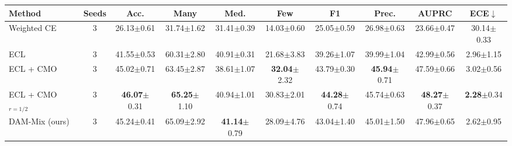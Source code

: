 \begin{tabular}{l c cccccccc}
\toprule
Method & Seeds & Acc. & Many & Med. & Few & F1 & Prec. & AUPRC & ECE$\downarrow$ \\
\midrule
Weighted CE & 3 & 26.13{\scriptsize$\pm$0.61} & 31.74{\scriptsize$\pm$1.62} & 31.41{\scriptsize$\pm$0.39} & 14.03{\scriptsize$\pm$0.60} & 25.05{\scriptsize$\pm$0.59} & 26.98{\scriptsize$\pm$0.63} & 23.66{\scriptsize$\pm$0.47} & 30.14{\scriptsize$\pm$0.33} \\
ECL & 3 & 41.55{\scriptsize$\pm$0.53} & 60.31{\scriptsize$\pm$2.80} & 40.91{\scriptsize$\pm$0.31} & 21.68{\scriptsize$\pm$3.83} & 39.26{\scriptsize$\pm$1.07} & 39.99{\scriptsize$\pm$1.04} & 42.99{\scriptsize$\pm$0.56} & 2.96{\scriptsize$\pm$1.15} \\
ECL + CMO & 3 & 45.02{\scriptsize$\pm$0.71} & 63.45{\scriptsize$\pm$2.87} & 38.61{\scriptsize$\pm$1.07} & \textbf{32.04}{\scriptsize$\pm$2.32} & 43.79{\scriptsize$\pm$0.30} & \textbf{45.94}{\scriptsize$\pm$0.71} & 47.59{\scriptsize$\pm$0.66} & 3.02{\scriptsize$\pm$0.56} \\
ECL + CMO$_{r=1/2}$ & 3 & \textbf{46.07}{\scriptsize$\pm$0.31} & \textbf{65.25}{\scriptsize$\pm$1.10} & 40.94{\scriptsize$\pm$1.01} & 30.83{\scriptsize$\pm$2.01} & \textbf{44.28}{\scriptsize$\pm$0.74} & 45.74{\scriptsize$\pm$0.63} & \textbf{48.27}{\scriptsize$\pm$0.37} & \textbf{2.28}{\scriptsize$\pm$0.34} \\
\midrule
DAM-Mix (ours) & 3 & 45.24{\scriptsize$\pm$0.41} & 65.09{\scriptsize$\pm$2.92} & \textbf{41.14}{\scriptsize$\pm$0.79} & 28.09{\scriptsize$\pm$4.76} & 43.04{\scriptsize$\pm$1.40} & 45.01{\scriptsize$\pm$1.50} & 47.96{\scriptsize$\pm$0.65} & 2.62{\scriptsize$\pm$0.95} \\
\bottomrule
\end{tabular}
